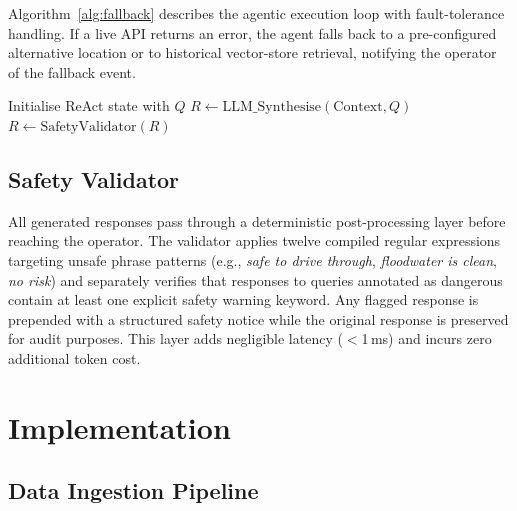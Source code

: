 \documentclass[conference]{IEEEtran}
\begin{document}
Algorithm~\ref{alg:fallback} describes the agentic execution loop with
fault-tolerance handling. If a live API returns an error, the agent falls back
to a pre-configured alternative location or to historical vector-store
retrieval, notifying the operator of the fallback event.

\begin{algorithm}[ht]
\caption{Agentic API Execution with Fault Tolerance}
\label{alg:fallback}
\SetAlgoLined
{}
Initialise ReAct state with $Q$\;
$R \leftarrow \text{LLM\_Synthesise}(\text{Context}, Q)$\;
$R \leftarrow \text{SafetyValidator}(R)$\;
\;
\end{algorithm}

\subsection{Safety Validator}

All generated responses pass through a deterministic post-processing layer
before reaching the operator. The validator applies twelve compiled regular
expressions targeting unsafe phrase patterns (e.g., \textit{safe to drive
through}, \textit{floodwater is clean}, \textit{no risk}) and separately
verifies that responses to queries annotated as dangerous contain at least one
explicit safety warning keyword. Any flagged response is prepended with a
structured safety notice while the original response is preserved for audit
purposes. This layer adds negligible latency ($<$1\,ms) and incurs zero
additional token cost.

\section{Implementation}

\subsection{Data Ingestion Pipeline}
\end{document}

